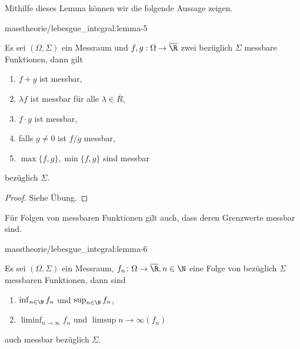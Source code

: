 \documentclass[letterpaper,10pt,german]{jupyterBook}
\begin{document}
\par
Mithilfe dieses Lemma können wir die folgende Aussage zeigen.
\begin{lemma}{}{masstheorie/lebesgue_integral:lemma-5}



\par
Es sei \((\Omega,\Sigma)\) ein Messraum und \(f,g:\Omega\to\overline{\R}\) zwei bezüglich \(\Sigma\) messbare Funktionen, dann gilt
\begin{enumerate}

\item {} 
\par
\(f+g\) ist messbar,

\item {} 
\par
\(\lambda f\) ist messbar für alle \(\lambda\in\overline{R}\),

\item {} 
\par
\(f\cdot g\) ist messbar,

\item {} 
\par
falls \(g\neq 0\) ist \(f/g\) messbar,

\item {} 
\par
\(\max\{f,g\}, \min\{f,g\}\) sind messbar

\end{enumerate}

\par
bezüglich \(\Sigma\).
\end{lemma}

\begin{proof}
 Siehe Übung.
\end{proof}

\par
Für Folgen von messbaren Funktionen gilt auch, dass deren Grenzwerte messbar sind.
\begin{lemma}{}{masstheorie/lebesgue_integral:lemma-6}



\par
Es sei \((\Omega,\Sigma)\) ein Messraum, \(f_n \colon \Omega\to\overline{\R},n\in\N\) eine Folge von bezüglich \(\Sigma\) messbaren Funktionen, dann sind
\begin{enumerate}

\item {} 
\par
\(\inf_{n\in\N} f_n\) und \(\sup_{n\in\N} f_n\),

\item {} 
\par
\(\liminf_{n\to\infty} f_n\) und \(\limsup{n\to\infty} (f_n)\)

\end{enumerate}

\par
auch messbar bezüglich \(\Sigma\).
\end{lemma}
\end{document}
